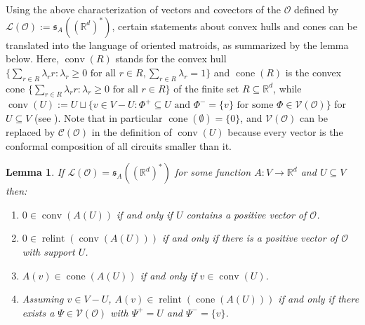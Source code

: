 \documentclass[a4paper,11pt,reqno, english]{amsart}
\newtheorem{lemma}[theorem]{Lemma}
\theoremstyle{definition}
\theoremstyle{remark}
\newcommand\R{\mathbb R}
\DeclareMathOperator{\cone}{\mathrm{cone}}
\DeclareMathOperator{\relint}{\mathrm{relint}}
\DeclareMathOperator{\conv}{\mathrm{conv}}
\begin{document}
Using the above characterization of vectors and covectors of the $\mathscr{O}$ defined by $\mathscr{L}(\mathscr{O}):=\mathfrak{s}_A((\R^d)^*)$, certain statements about convex hulls and cones can be translated into the language of oriented matroids, as summarized by the lemma below. Here, $\conv(R)$ stands for the convex hull $\{\sum_{r\in R}\lambda_rr:\lambda_r\geq 0\text{~for all~}r\in R,\sum_{r\in R}\lambda_r=1\}$ and $\cone(R)$ is the convex cone $\{\sum_{r\in R}\lambda_rr:\lambda_r\geq 0\text{~for all~}r\in R\}$ of the finite set $R\subseteq\R^d$, while $\conv(U):=U\sqcup\{v\in V-U:\Phi^+\subseteq U\text{~and~}\Phi^-=\{v\}\text{~for some~}\Phi\in\mathscr{V}(\mathscr{O})\}$ for $U\subseteq V$ (see \cite[Exercise 3.9]{OrientedMatroids}). Note that in particular $\cone(\emptyset)=\{0\}$, and $\mathscr{V}(\mathscr{O})$ can be replaced by $\mathscr{C}(\mathscr{O})$ in the definition of $\conv(U)$ because every vector is the conformal composition of all circuits smaller than it.
\begin{lemma}\label{lem:0-in-conv-interpreted-in-oms}
    If $\mathscr{L}(\mathscr{O})=\mathfrak{s}_A((\R^d)^*)$ for some function $A\colon V\to\R^d$ and $U\subseteq V$ then:
    \begin{enumerate}[label=\normalfont{(\arabic*)}]
        \item\label{lem:0-in-conv-interpreted-in-oms:full} $0\in\conv(A(U))$ if and only if $U$ contains a positive vector of $\mathscr{O}$.
        \item\label{lem:0-in-conv-interpreted-in-oms:relint} $0\in\relint(\conv(A(U)))$ if and only if there is a positive vector of $\mathscr{O}$ with support $U$.
        \item\label{lem:0-in-conv-interpreted-in-oms:cone} $A(v)\in\cone(A(U))$ if and only if $v\in\conv(U)$.
        \item\label{lem:0-in-cov-interpreted-in-oms:relintcone} Assuming $v\in V-U$, $A(v)\in\relint(\cone(A(U)))$ if and only if there exists a $\Psi\in\mathscr{V}(\mathscr{O})$ with $\Psi^+=U$ and $\Psi^-=\{v\}$. 
    \end{enumerate}
\end{lemma}
\end{document}
